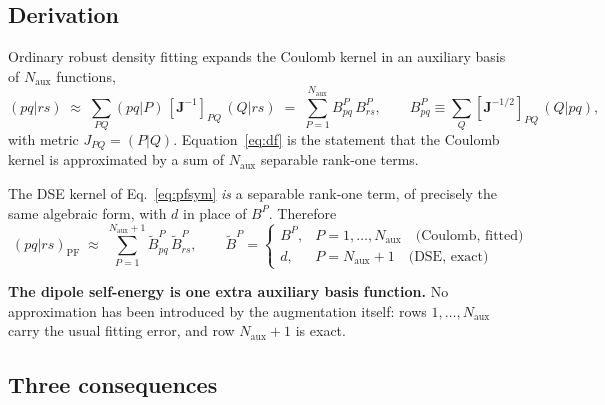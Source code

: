 \documentclass[11pt]{article}
\newcommand{\naux}{N_{\mathrm{aux}}}
\begin{document}
\subsection{Derivation}

Ordinary robust density fitting expands the Coulomb kernel in an auxiliary
basis of $\naux$ functions,
\begin{equation}
(pq|rs) \;\approx\; \sum_{PQ} (pq|P)\,[\bm{J}^{-1}]_{PQ}\,(Q|rs)
\;=\; \sum_{P=1}^{\naux} B^{P}_{pq}\, B^{P}_{rs} ,
\qquad
B^{P}_{pq} \equiv \sum_{Q} [\bm{J}^{-1/2}]_{PQ}\,(Q|pq),
\label{eq:df}
\end{equation}
with metric $J_{PQ} = (P|Q)$. Equation~\eqref{eq:df} is the statement that the
Coulomb kernel is approximated by a sum of $\naux$ separable rank-one terms.

The DSE kernel of Eq.~\eqref{eq:pfsym} \emph{is} a separable rank-one term, of
precisely the same algebraic form, with $d$ in place of $B^P$. Therefore
\begin{equation}
\boxed{\;
(pq|rs)_{\mathrm{PF}} \;\approx\; \sum_{P=1}^{\naux+1} \tilde{B}^{P}_{pq}\,\tilde{B}^{P}_{rs},
\qquad
\tilde{B}^{P} =
\begin{cases}
B^{P}, & P = 1,\dots,\naux \quad\text{(Coulomb, fitted)}\\[3pt]
d, & P = \naux+1 \quad\text{(DSE, exact)}
\end{cases}
\;}
\label{eq:augmented}
\end{equation}

\noindent
\textbf{The dipole self-energy is one extra auxiliary basis function.} No
approximation has been introduced by the augmentation itself: rows
$1,\dots,\naux$ carry the usual fitting error, and row $\naux+1$ is exact.

\subsection{Three consequences}
\end{document}
